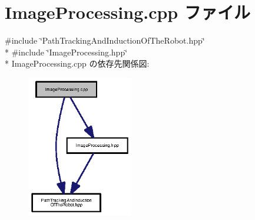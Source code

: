 \section{Image\-Processing.\-cpp ファイル}
\label{_image_processing_8cpp}
{\ttfamily \#include \char`\"{}Path\-Tracking\-And\-Induction\-Of\-The\-Robot.\-hpp\char`\"{}}\\*
{\ttfamily \#include \char`\"{}Image\-Processing.\-hpp\char`\"{}}\\*
Image\-Processing.\-cpp の依存先関係図\-:\nopagebreak
\begin{figure}[H]
\begin{center}
\leavevmode
\includegraphics[width=131pt]{_image_processing_8cpp__incl}
\end{center}
\end{figure}
